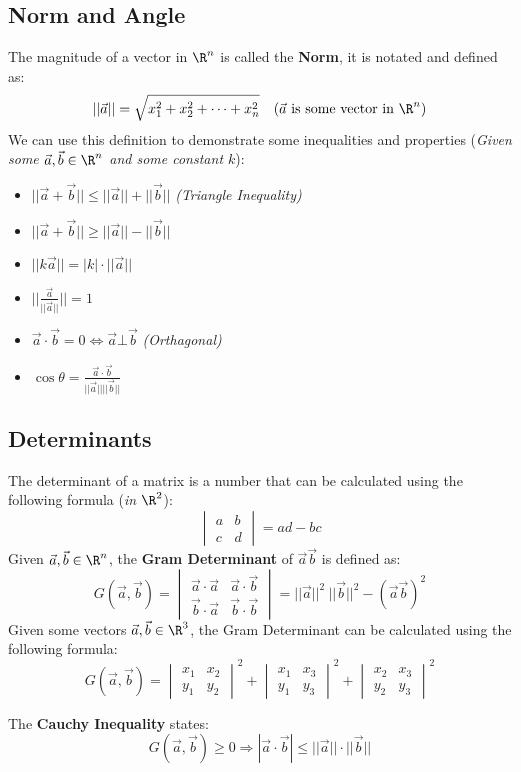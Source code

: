 \documentclass[a4paper]{article}
\begin{document}
  \subsection{Norm and Angle}
  The magnitude of a vector in $\R^n$ is called the \textbf{Norm}, it is notated and defined as:
  \[
    ||\vec{a}|| = \sqrt{x_1^2 + x_2^2 + \dots + x_n^2} \quad (\vec{a}\textrm{ is some vector in }\R^n)
  \]
  We can use this definition to demonstrate some inequalities and properties (\textit{Given some $\vec{a},\vec{b} \in \R^n$ and some constant $k$}):
  \begin{itemize}
    \item $|| \vec{a} + \vec{b} ||  \le ||\vec{a}|| + ||\vec{b}||$ \textit{(Triangle Inequality)}
    \item $|| \vec{a} + \vec{b} || \geq ||\vec{a}|| - ||\vec{b}||$
    \item $|| k \vec{a} || = |k| \cdot || \vec{a}||$
    \item $|| \displaystyle\frac{\vec{a}}{||\vec{a}||}|| = 1$
    \item $\vec{a} \cdot \vec{b} = 0 \Leftrightarrow \vec{a} \bot \vec{b}$ \textit{(Orthagonal)}
    \item $\cos \theta = \displaystyle\frac{\vec{a}\cdot\vec{b}}{||\vec{a}||  ||\vec{b}||}$
  \end{itemize}
  \subsection{Determinants}
  The determinant of a matrix is a number that can be calculated using the following formula (\textit{in $\R^2$}):
  \[
    \begin{vmatrix}
      a & b \\ c & d
    \end{vmatrix}
    = ad - bc
  \]
  Given $\vec{a},\vec{b} \in \R^n$, the \textbf{Gram Determinant} of $\vec{a}\vec{b}$ is defined as:
  \[
    G(\vec{a},\vec{b})
    = \begin{vmatrix}
      \vec{a} \cdot \vec{a} & \vec{a} \cdot \vec{b} \\
      \vec{b} \cdot \vec{a} & \vec{b} \cdot \vec{b}
    \end{vmatrix}
    = ||\vec{a}||^2 \ ||\vec{b}||^2 - (\vec{a}\vec{b})^2
  \]
  Given some vectors $\vec{a},\vec{b} \in \R^3$, the Gram Determinant can be calculated using the following formula:
  \[
    G(\vec{a},\vec{b}) = \begin{vmatrix}
      x_1 & x_2 \\ y_1 & y_2 
    \end{vmatrix}^2 +
    \begin{vmatrix}
      x_1 & x_3 \\ y_1 & y_3
    \end{vmatrix}^2 +
    \begin{vmatrix}
      x_2 & x_3 \\ y_2 & y_3
    \end{vmatrix}^2
  \]
  \begin{lemma}
    The \textbf{Cauchy Inequality} states:
    \[
      G (\vec{a},\vec{b}) \geq 0 \Rightarrow |\vec{a} \cdot \vec{b}| \le || \vec{a}|| \cdot || \vec{b} ||
    \]
  \end{lemma}
\end{document}
